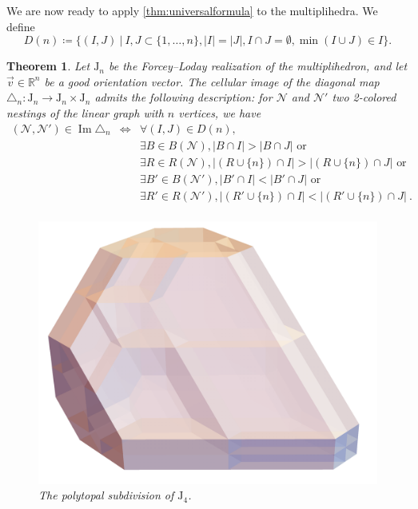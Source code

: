 \documentclass[twoside, 12pt]{amsart}
\newtheorem{theorem}{Theorem}
\theoremstyle{remark}
\newcommand{\RR}{\mathbb{R}}
\newcommand{\J}{\mathrm{J}}
\DeclareMathOperator{\Ima}{Im} %
\begin{document}
We are now ready to apply \cref{thm:universalformula} to the multiplihedra. We define \[ D(n)\coloneqq \{(I,J) \ | \ I,J\subset\{1,\ldots,n\}, |I|=|J|, I\cap J=\emptyset, \min(I\cup J)\in I \}. \]

\begin{theorem}\label{thm:formuladiagonal}
Let $\J_n$ be the Forcey--Loday realization of the multiplihedron, and let $\vec v \in \RR^n$ be a good orientation vector. The cellular image of the diagonal map $\triangle_n : \J_n \to \J_n \times \J_n$ admits the following description: for $\mathcal{N}$ and $\mathcal{N}'$ two 2-colored nestings of the linear graph with $n$ vertices, we have
\begin{eqnarray*}
  (\mathcal{N},\mathcal{N}') \in \Ima\triangle_n 
  & \iff & \forall (I,J) \in D(n), \\
  && \exists B \in B(\mathcal{N}), |B\cap I|>|B\cap J| \text{ or } \\
  && \exists R \in R(\mathcal{N}), |(R\cup \{n\}) \cap I|>| (R\cup \{n\}) \cap J| \text{ or } \\
  && \exists B' \in B(\mathcal{N}'), |B'\cap I|<|B'\cap J| \text{ or } \\
  && \exists R' \in R(\mathcal{N}'), |(R'\cup \{n\}) \cap I|<| (R'\cup \{n\}) \cap J| \ . \\
\end{eqnarray*}
\begin{figure}[h!]
\centering
\includegraphics[width=0.8\linewidth]{J4.png} 
\caption{The polytopal subdivision of $\J_4$.}
\label{Fig5:J4}
\end{figure}
\end{theorem}
\end{document}
